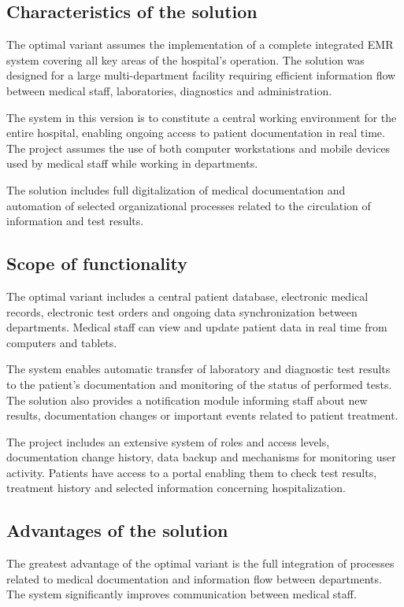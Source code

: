\subsection{Characteristics of the solution}
The optimal variant assumes the implementation of a complete integrated EMR system covering all key areas of the hospital's operation. The solution was designed for a large multi-department facility requiring efficient information flow between medical staff, laboratories, diagnostics and administration.

The system in this version is to constitute a central working environment for the entire hospital, enabling ongoing access to patient documentation in real time. The project assumes the use of both computer workstations and mobile devices used by medical staff while working in departments.

The solution includes full digitalization of medical documentation and automation of selected organizational processes related to the circulation of information and test results.

\subsection{Scope of functionality}
The optimal variant includes a central patient database, electronic medical records, electronic test orders and ongoing data synchronization between departments. Medical staff can view and update patient data in real time from computers and tablets.

The system enables automatic transfer of laboratory and diagnostic test results to the patient's documentation and monitoring of the status of performed tests. The solution also provides a notification module informing staff about new results, documentation changes or important events related to patient treatment.

The project includes an extensive system of roles and access levels, documentation change history, data backup and mechanisms for monitoring user activity. Patients have access to a portal enabling them to check test results, treatment history and selected information concerning hospitalization.


\subsection{Advantages of the solution}
The greatest advantage of the optimal variant is the full integration of processes related to medical documentation and information flow between departments. The system significantly improves communication between medical staff.


